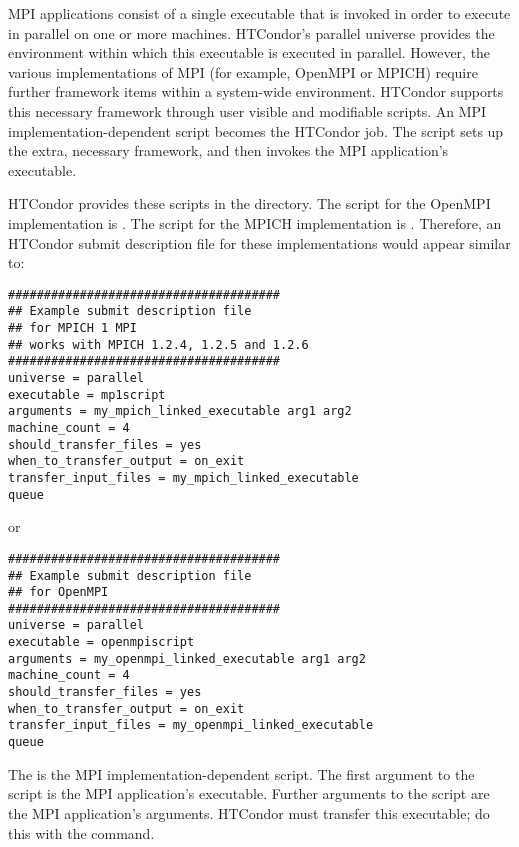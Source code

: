 
MPI applications consist of a single executable that is invoked in order to
execute in parallel on one or more machines. 
HTCondor's parallel universe provides the environment within
which this executable is executed in parallel.
However, the various implementations of MPI
(for example, OpenMPI or MPICH) require further framework items within
a system-wide environment.
HTCondor supports this necessary framework through 
user visible and modifiable scripts.
An MPI implementation-dependent script becomes the HTCondor job.
The script sets up the extra, necessary framework,
and then invokes the MPI application's executable.

HTCondor provides these scripts in the
directory.
The script for the OpenMPI implementation is .
The script for the MPICH implementation is .
Therefore, an HTCondor submit description file for these
implementations would appear similar to:

\begin{verbatim}
######################################
## Example submit description file
## for MPICH 1 MPI
## works with MPICH 1.2.4, 1.2.5 and 1.2.6
######################################
universe = parallel
executable = mp1script
arguments = my_mpich_linked_executable arg1 arg2
machine_count = 4
should_transfer_files = yes
when_to_transfer_output = on_exit
transfer_input_files = my_mpich_linked_executable
queue
\end{verbatim}

or

\begin{verbatim}
######################################
## Example submit description file
## for OpenMPI
######################################
universe = parallel
executable = openmpiscript
arguments = my_openmpi_linked_executable arg1 arg2
machine_count = 4
should_transfer_files = yes
when_to_transfer_output = on_exit
transfer_input_files = my_openmpi_linked_executable
queue
\end{verbatim}

The  is the MPI implementation-dependent script.
The first argument to the script is the MPI application's 
executable.
Further arguments to the script are the MPI application's arguments.
HTCondor must transfer this executable;
do this with the  command.

